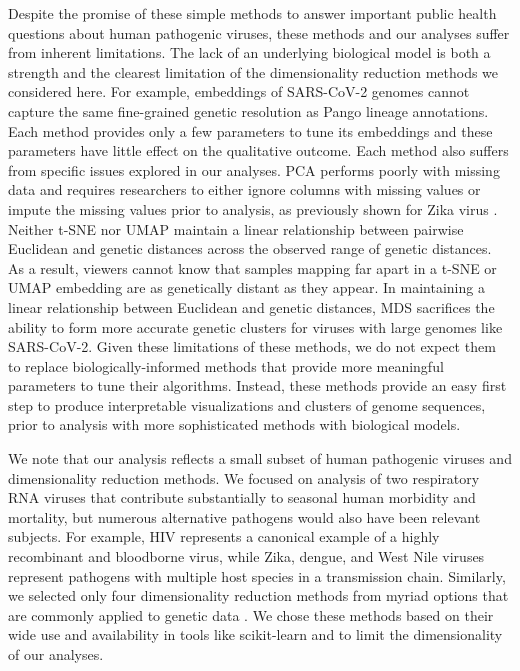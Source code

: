 \documentclass[10pt,letterpaper]{article}
\begin{document}
Despite the promise of these simple methods to answer important public health questions about human pathogenic viruses, these methods and our analyses suffer from inherent limitations.
The lack of an underlying biological model is both a strength and the clearest limitation of the dimensionality reduction methods we considered here.
For example, embeddings of SARS-CoV-2 genomes cannot capture the same fine-grained genetic resolution as Pango lineage annotations.
Each method provides only a few parameters to tune its embeddings and these parameters have little effect on the qualitative outcome.
Each method also suffers from specific issues explored in our analyses.
PCA performs poorly with missing data and requires researchers to either ignore columns with missing values or impute the missing values prior to analysis, as previously shown for Zika virus \cite{metsky_2017}.
Neither t-SNE nor UMAP maintain a linear relationship between pairwise Euclidean and genetic distances across the observed range of genetic distances.
As a result, viewers cannot know that samples mapping far apart in a t-SNE or UMAP embedding are as genetically distant as they appear.
In maintaining a linear relationship between Euclidean and genetic distances, MDS sacrifices the ability to form more accurate genetic clusters for viruses with large genomes like SARS-CoV-2.
Given these limitations of these methods, we do not expect them to replace biologically-informed methods that provide more meaningful parameters to tune their algorithms.
Instead, these methods provide an easy first step to produce interpretable visualizations and clusters of genome sequences, prior to analysis with more sophisticated methods with biological models.

We note that our analysis reflects a small subset of human pathogenic viruses and dimensionality reduction methods.
We focused on analysis of two respiratory RNA viruses that contribute substantially to seasonal human morbidity and mortality, but numerous alternative pathogens would also have been relevant subjects.
For example, HIV represents a canonical example of a highly recombinant and bloodborne virus, while Zika, dengue, and West Nile viruses represent pathogens with multiple host species in a transmission chain.
Similarly, we selected only four dimensionality reduction methods from myriad options that are commonly applied to genetic data \cite{Armstrong2022}.
We chose these methods based on their wide use and availability in tools like scikit-learn \cite{Pedregosa2011} and to limit the dimensionality of our analyses.
\end{document}
